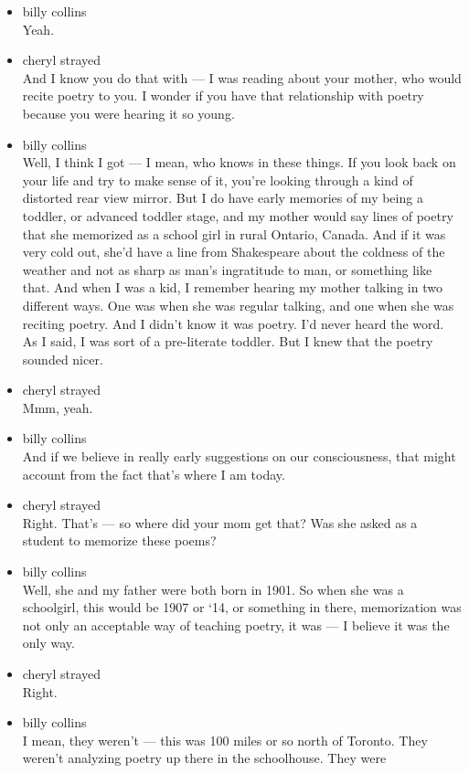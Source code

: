 \begin{itemize}
\item
  billy collins\\
  Yeah.
\item
  cheryl strayed\\
  And I know you do that with --- I was reading about your mother, who
  would recite poetry to you. I wonder if you have that relationship
  with poetry because you were hearing it so young.
\item
  billy collins\\
  Well, I think I got --- I mean, who knows in these things. If you look
  back on your life and try to make sense of it, you're looking through
  a kind of distorted rear view mirror. But I do have early memories of
  my being a toddler, or advanced toddler stage, and my mother would say
  lines of poetry that she memorized as a school girl in rural Ontario,
  Canada. And if it was very cold out, she'd have a line from
  Shakespeare about the coldness of the weather and not as sharp as
  man's ingratitude to man, or something like that. And when I was a
  kid, I remember hearing my mother talking in two different ways. One
  was when she was regular talking, and one when she was reciting
  poetry. And I didn't know it was poetry. I'd never heard the word. As
  I said, I was sort of a pre-literate toddler. But I knew that the
  poetry sounded nicer.
\item
  cheryl strayed\\
  Mmm, yeah.
\item
  billy collins\\
  And if we believe in really early suggestions on our consciousness,
  that might account from the fact that's where I am today.
\item
  cheryl strayed\\
  Right. That's --- so where did your mom get that? Was she asked as a
  student to memorize these poems?
\item
  billy collins\\
  Well, she and my father were both born in 1901. So when she was a
  schoolgirl, this would be 1907 or `14, or something in there,
  memorization was not only an acceptable way of teaching poetry, it was
  --- I believe it was the only way.
\item
  cheryl strayed\\
  Right.
\item
  billy collins\\
  I mean, they weren't --- this was 100 miles or so north of Toronto.
  They weren't analyzing poetry up there in the schoolhouse. They were

\end{itemize}
